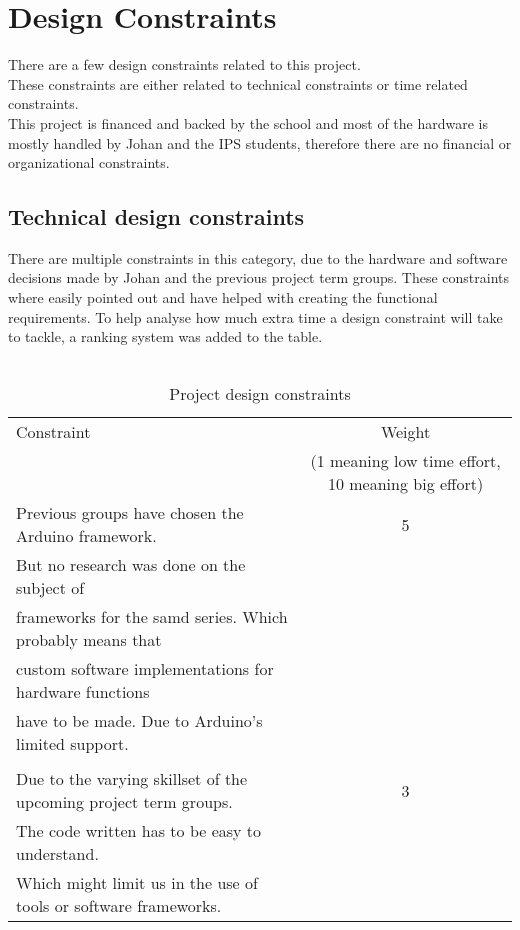 \section{Design Constraints}
There are a few design constraints related to this project.\\ 
These constraints are either related to technical constraints or time related constraints. \\ This project is financed and backed by the school and most of the hardware is mostly handled by Johan and the IPS students, therefore there are no financial or organizational constraints.
\subsection{Technical design constraints}
There are multiple constraints in this category, due to the hardware and software decisions made by Johan and the previous project term groups. These constraints where easily pointed out and have helped with creating the functional requirements. To help analyse how much extra time a design constraint will take to tackle, a ranking system was added to the table.\\\\
\begin{table}[!hb]
\begin{tabular}{|l|c|}
\hline
    Constraint & Weight \\
               & (1 meaning low time effort, 10 meaning big effort) \\
    \hline\hline
     Previous groups have chosen the Arduino framework. & 5\\
     But no research was done on the subject of \\frameworks for the samd series. Which probably means that \\ custom software implementations for hardware functions \\have to be made. Due to Arduino's limited support.\\ & \\
     \hline
     Due to the varying skillset of the upcoming project term groups. & 3\\
     The code written has to be easy to understand. \\ Which might limit us in the use of tools or software frameworks.\\
     \hline
\end{tabular}
 \caption{Project design constraints}
 \label{tab:functional_requirements}
\end{table}